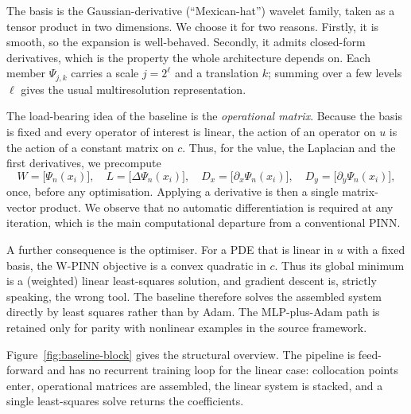 \documentclass[pdflatex,sn-mathphys-num]{sn-jnl}%
\theoremstyle{thmstyleone}%
\theoremstyle{thmstyletwo}%
\theoremstyle{thmstylethree}%
\begin{document}
The basis is the Gaussian-derivative (``Mexican-hat'') wavelet family, taken as a tensor product in two dimensions. We choose it for two reasons. Firstly, it is smooth, so the expansion is well-behaved. Secondly, it admits closed-form derivatives, which is the property the whole architecture depends on. Each member $\Psi_{j,k}$ carries a scale $j=2^{\ell}$ and a translation $k$; summing over a few levels $\ell$ gives the usual multiresolution representation.

The load-bearing idea of the baseline is the \emph{operational matrix}. Because the basis is fixed and every operator of interest is linear, the action of an operator on $u$ is the action of a constant matrix on $c$. Thus, for the value, the Laplacian and the first derivatives, we precompute
\begin{equation}
W = \big[\Psi_n(x_i)\big],\quad
L = \big[\Delta\Psi_n(x_i)\big],\quad
D_x = \big[\partial_x\Psi_n(x_i)\big],\quad
D_y = \big[\partial_y\Psi_n(x_i)\big],
\label{eq:opmats}
\end{equation}
once, before any optimisation. Applying a derivative is then a single matrix-vector product. We observe that no automatic differentiation is required at any iteration, which is the main computational departure from a conventional PINN.

A further consequence is the optimiser. For a PDE that is linear in $u$ with a fixed basis, the W-PINN objective is a convex quadratic in $c$. Thus its global minimum is a (weighted) linear least-squares solution, and gradient descent is, strictly speaking, the wrong tool. The baseline therefore solves the assembled system directly by least squares rather than by Adam. The MLP-plus-Adam path is retained only for parity with nonlinear examples in the source framework.

Figure~\ref{fig:baseline-block} gives the structural overview. The pipeline is feed-forward and has no recurrent training loop for the linear case: collocation points enter, operational matrices are assembled, the linear system is stacked, and a single least-squares solve returns the coefficients.
\end{document}
